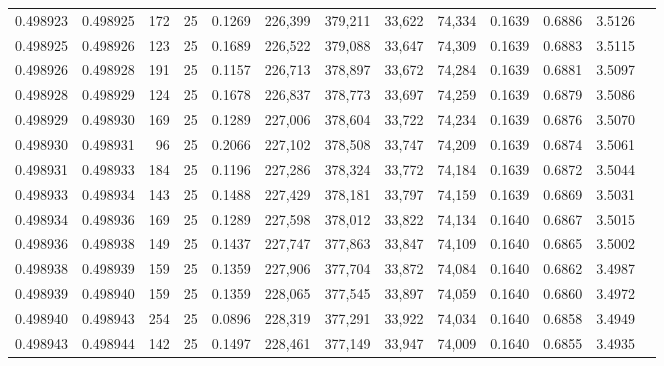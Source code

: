 \begin{tabular}{rrrrrrrrrrrrr}
0.498923 & 0.498925 & 172 &  25 &                                     0.1269 & 226,399 & 379,211 &  33,622 &  74,334 & 0.1639 & 0.6886 & 3.5126 \\
0.498925 & 0.498926 & 123 &  25 &                                     0.1689 & 226,522 & 379,088 &  33,647 &  74,309 & 0.1639 & 0.6883 & 3.5115 \\
0.498926 & 0.498928 & 191 &  25 &                                     0.1157 & 226,713 & 378,897 &  33,672 &  74,284 & 0.1639 & 0.6881 & 3.5097 \\
0.498928 & 0.498929 & 124 &  25 &                                     0.1678 & 226,837 & 378,773 &  33,697 &  74,259 & 0.1639 & 0.6879 & 3.5086 \\
0.498929 & 0.498930 & 169 &  25 &                                     0.1289 & 227,006 & 378,604 &  33,722 &  74,234 & 0.1639 & 0.6876 & 3.5070 \\
0.498930 & 0.498931 &  96 &  25 &                                     0.2066 & 227,102 & 378,508 &  33,747 &  74,209 & 0.1639 & 0.6874 & 3.5061 \\
0.498931 & 0.498933 & 184 &  25 &                                     0.1196 & 227,286 & 378,324 &  33,772 &  74,184 & 0.1639 & 0.6872 & 3.5044 \\
0.498933 & 0.498934 & 143 &  25 &                                     0.1488 & 227,429 & 378,181 &  33,797 &  74,159 & 0.1639 & 0.6869 & 3.5031 \\
0.498934 & 0.498936 & 169 &  25 &                                     0.1289 & 227,598 & 378,012 &  33,822 &  74,134 & 0.1640 & 0.6867 & 3.5015 \\
0.498936 & 0.498938 & 149 &  25 &                                     0.1437 & 227,747 & 377,863 &  33,847 &  74,109 & 0.1640 & 0.6865 & 3.5002 \\
0.498938 & 0.498939 & 159 &  25 &                                     0.1359 & 227,906 & 377,704 &  33,872 &  74,084 & 0.1640 & 0.6862 & 3.4987 \\
0.498939 & 0.498940 & 159 &  25 &                                     0.1359 & 228,065 & 377,545 &  33,897 &  74,059 & 0.1640 & 0.6860 & 3.4972 \\
0.498940 & 0.498943 & 254 &  25 &                                     0.0896 & 228,319 & 377,291 &  33,922 &  74,034 & 0.1640 & 0.6858 & 3.4949 \\
0.498943 & 0.498944 & 142 &  25 &                                     0.1497 & 228,461 & 377,149 &  33,947 &  74,009 & 0.1640 & 0.6855 & 3.4935 \\

\end{tabular}
